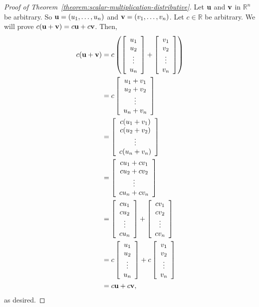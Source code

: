 \documentclass{book}
\theoremstyle{ekimcustom}
\begin{document}
\begin{proof}[Proof of Theorem~\ref{theorem:scalar-multiplication-distributive}]
Let ${\bf u}$ and ${\bf v}$ in $\mathbb{R}^n$ be arbitrary. So ${\bf u} = (u_1,\dots,u_n)$ and ${\bf v} = (v_1,\dots,v_n)$. Let $c \in \mathbb{R}$ be arbitrary. We will prove $c({\bf u}+{\bf v}) = c{\bf u} + c{\bf v}$. Then,
\begin{align*}
c({\bf u}+{\bf v})
&= c\left( \left[ \begin{array}{c}u_1\\u_2\\\vdots\\u_n\end{array} \right] + \left[ \begin{array}{c}v_1\\v_2\\\vdots\\v_n\end{array} \right] \right)\\
&= c\left[ \begin{array}{c}u_1+v_1\\u_2+v_2\\\vdots\\u_n+v_n\end{array} \right]\\
&= \left[ \begin{array}{c}c(u_1+v_1)\\c(u_2+v_2)\\\vdots\\c(u_n+v_n)\end{array} \right]\\
&= \left[ \begin{array}{c}cu_1+cv_1\\cu_2+cv_2\\\vdots\\cu_n+cv_n\end{array} \right]\\
&= \left[ \begin{array}{c}cu_1\\cu_2\\\vdots\\cu_n\end{array} \right] + \left[ \begin{array}{c}cv_1\\cv_2\\\vdots\\cv_n\end{array} \right]\\
&= c \left[ \begin{array}{c}u_1\\u_2\\\vdots\\u_n\end{array} \right] + c\left[ \begin{array}{c}v_1\\v_2\\\vdots\\v_n\end{array} \right] \\
&=c{\bf u}+c{\bf v},
\end{align*}
as desired.
\end{proof}
\end{document}
